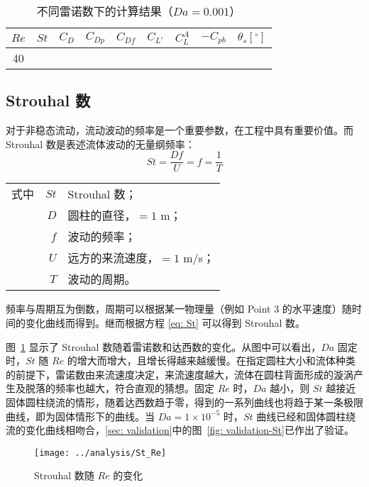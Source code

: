 \begin{table}[h]
	\caption{不同雷诺数下的计算结果（$Da=0.001$）}\label{tab: results-1e-3}
	\vspace{.5em}\centering\wuhao
	\begin{tabular}{*{9}{c}}
		\toprule[1.5pt]
		$Re$ & $St$ & $C_D$ & $C_{Dp}$ & $C_{Df}$ & $C_{L'}$ & $C_L^A$ & $-C_{pb}$ & $\theta_s[^\circ]$ \\
		\midrule[1pt]
		 40 &  \\
		\bottomrule[1.5pt]
	\end{tabular}
\end{table}

\subsection{Strouhal 数}

对于非稳态流动，流动波动的频率是一个重要参数，在工程中具有重要价值。而 Strouhal 数是表述流体波动的无量纲频率：
\begin{equation}\label{eq: St}
	St = \frac{Df}{U} = f = \frac{1}{T}
\end{equation}
\begin{tabularx}{\textwidth}{@{}l@{\quad}r@{——}X@{}}
	式中 & $St$ & Strouhal 数；\\
		& $D$ & 圆柱的直径，$=1$ m；\\
		& $f$ & 波动的频率；\\
		& $U$ & 远方的来流速度，$=1$ m/s；\\
		& $T$ & 波动的周期。 
\end{tabularx}\vspace{3.15bp}
频率与周期互为倒数，周期可以根据某一物理量（例如 Point 3 的水平速度）随时间的变化曲线而得到。继而根据方程 \eqref{eq: St} 可以得到 Strouhal 数。%

图~\ref{fig: St} 显示了 Strouhal 数随着雷诺数和达西数的变化。从图中可以看出，$Da$ 固定时，$St$ 随 $Re$ 的增大而增大，且增长得越来越缓慢。在指定圆柱大小和流体种类的前提下，雷诺数由来流速度决定，来流速度越大，流体在圆柱背面形成的漩涡产生及脱落的频率也越大，符合直观的猜想。固定 $Re$ 时，$Da$ 越小，则 $St$ 越接近固体圆柱绕流的情形，随着达西数趋于零，得到的一系列曲线也将趋于某一条极限曲线，即为固体情形下的曲线。当 $Da=1 \times 10^{-5}$ 时，$St$ 曲线已经和固体圆柱绕流的变化曲线相吻合，\ref{sec: validation}中的图~\ref{fig: validation-St}已作出了验证。

\begin{figure}
	\centering
	\texttt{[image: ../analysis/St\_Re]}
	\caption{Strouhal 数随 $Re$ 的变化}
	\label{fig: St}
\end{figure}

